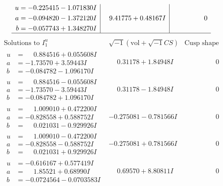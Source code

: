 \documentclass[1p]{elsarticle_modified}
\theoremstyle{definition}
\newcommand{\I}{\sqrt{-1}}
\begin{document}
$$\begin{array}{c|c|c}
\begin{aligned}
u &= -0.225415 - 1.071830 I \\
a &= -0.094820 - 1.372120 I \\
b &= -0.057743 + 1.348270 I\end{aligned}
 & \phantom{-}9.41775 + 0.48167 I & \phantom{-0.000000 } 0\\
 \hline 
 \end{array}$$\newpage$$\begin{array}{c|c|c}  
\text{Solutions to }I^u_{1}& \I (\text{vol} + \sqrt{-1}CS) & \text{Cusp shape}\\
 \hline 
\begin{aligned}
u &= \phantom{-}0.884516 + 0.055608 I \\
a &= -1.73570 + 3.59443 I \\
b &= -0.084782 - 1.096170 I\end{aligned}
 & \phantom{-}0.31178 + 1.84948 I & \phantom{-0.000000 } 0 \\ \hline\begin{aligned}
u &= \phantom{-}0.884516 - 0.055608 I \\
a &= -1.73570 - 3.59443 I \\
b &= -0.084782 + 1.096170 I\end{aligned}
 & \phantom{-}0.31178 - 1.84948 I & \phantom{-0.000000 } 0 \\ \hline\begin{aligned}
u &= \phantom{-}1.009010 + 0.472200 I \\
a &= -0.828558 + 0.588752 I \\
b &= \phantom{-}0.021031 - 0.929926 I\end{aligned}
 & -0.275081 - 0.781566 I & \phantom{-0.000000 } 0 \\ \hline\begin{aligned}
u &= \phantom{-}1.009010 - 0.472200 I \\
a &= -0.828558 - 0.588752 I \\
b &= \phantom{-}0.021031 + 0.929926 I\end{aligned}
 & -0.275081 + 0.781566 I & \phantom{-0.000000 } 0 \\ \hline\begin{aligned}
u &= -0.616167 + 0.577419 I \\
a &= \phantom{-}1.85521 + 0.68990 I \\
b &= -0.0724564 - 0.0703583 I\end{aligned}
 & \phantom{-}0.69570 + 8.80811 I & \phantom{-0.000000 } 0 \\ \hline\begin{aligned}

\end{aligned}
\end{array}$$
\end{document}
